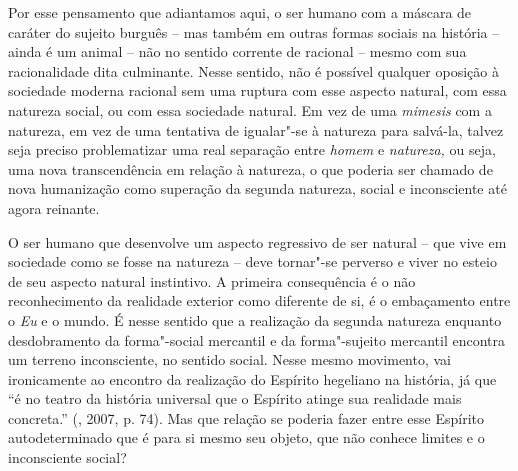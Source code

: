 Por esse pensamento que adiantamos aqui, o ser humano com a máscara de
caráter do sujeito burguês -- mas também em outras formas sociais na
história -- ainda é um animal -- não no sentido corrente de racional --
mesmo com sua racionalidade dita culminante. Nesse sentido, não é
possível qualquer oposição à sociedade moderna racional sem uma ruptura
com esse aspecto natural, com essa natureza social, ou com essa
sociedade natural. Em vez de uma \emph{mimesis} com a natureza, em vez
de uma tentativa de igualar"-se à natureza para salvá-la, talvez seja
preciso problematizar uma real separação entre \emph{homem} e
\emph{natureza,} ou seja, uma nova transcendência em relação à natureza,
o que poderia ser chamado de nova humanização como superação da segunda
natureza, social e inconsciente até agora reinante.

O ser humano que desenvolve um aspecto regressivo de ser natural -- que
vive em sociedade como se fosse na natureza -- deve tornar"-se perverso e
viver no esteio de seu aspecto natural instintivo. A primeira
consequência é o não reconhecimento da realidade exterior como diferente
de si, é o embaçamento entre o \emph{Eu} e o mundo. É nesse sentido que
a realização da segunda natureza enquanto desdobramento da forma"-social
mercantil e da forma"-sujeito mercantil encontra um terreno inconsciente,
no sentido social. Nesse mesmo movimento, vai ironicamente ao encontro
da realização do Espírito hegeliano na história, já que ``é no teatro da
história universal que o Espírito atinge sua realidade mais concreta.''
(, 2007, p. 74). Mas que relação se poderia fazer entre esse
Espírito autodeterminado que é para si mesmo seu objeto, que não conhece
limites e o inconsciente social?

